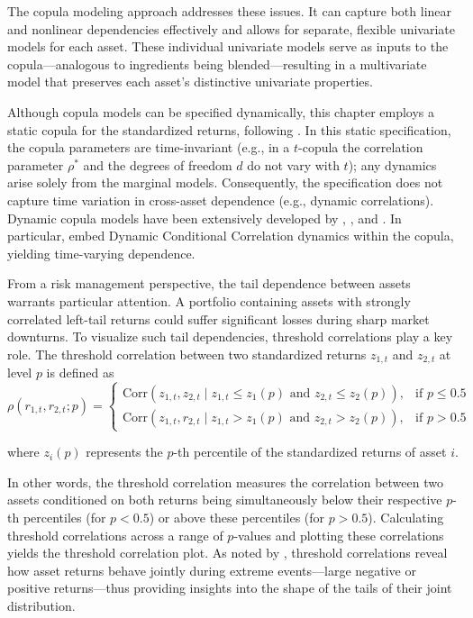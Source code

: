 The copula modeling approach addresses these issues. It can capture both linear and nonlinear dependencies effectively and allows for separate, flexible univariate models for each asset. These individual univariate models serve as inputs to the copula—analogous to ingredients being blended—resulting in a multivariate model that preserves each asset’s distinctive univariate properties.

Although copula models can be specified dynamically, this chapter employs a static copula for the standardized returns, following . In this static specification, the copula parameters are time-invariant (e.g., in a $t$-copula the correlation parameter $\rho^*$ and the degrees of freedom $d$ do not vary with $t$); any dynamics arise solely from the marginal models. Consequently, the specification does not capture time variation in cross-asset dependence (e.g., dynamic correlations). Dynamic copula models have been extensively developed by , , and . In particular,  embed Dynamic Conditional Correlation dynamics within the copula, yielding time-varying dependence.

From a risk management perspective, the tail dependence between assets warrants particular attention. A portfolio containing assets with strongly correlated left-tail returns could suffer significant losses during sharp market downturns. To visualize such tail dependencies, threshold correlations play a key role. The threshold correlation between two standardized returns $z_{1,t}$ and $z_{2,t}$ at level $p$ is defined as
\begin{equation}
\rho(r_{1,t}, r_{2,t}; p) =
\begin{cases}
\text{Corr}\left(z_{1,t}, z_{2,t} \mid z_{1,t} \leq z_1(p) \text{ and } z_{2,t} \leq z_2(p)\right), & \text{if } p \leq 0.5 \\[0.5em]
\text{Corr}\left(z_{1,t}, r_{2,t} \mid z_{1,t} > z_1(p) \text{ and } z_{2,t} > z_2(p)\right), & \text{if } p > 0.5
\end{cases}
\label{eq:5.1}
\end{equation}


where $z_{i}(p)$ represents the $p$-th percentile of the standardized returns of asset $i$.

In other words, the threshold correlation measures the correlation between two assets conditioned on both returns being simultaneously below their respective $p$-th percentiles (for $p<0.5$) or above these percentiles (for $p>0.5$). Calculating threshold correlations across a range of $p$-values and plotting these correlations yields the threshold correlation plot. As noted by , threshold correlations reveal how asset returns behave jointly during extreme events—large negative or positive returns—thus providing insights into the shape of the tails of their joint distribution.


